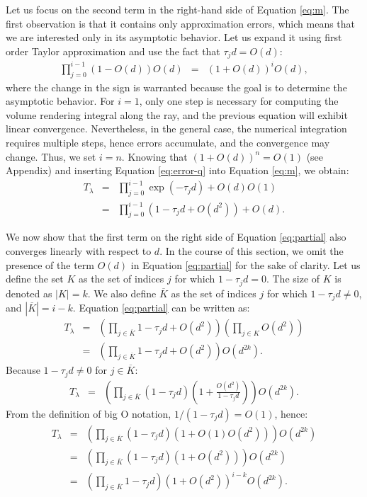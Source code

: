 Let us focus on the second term in the right-hand side of Equation \eqref{eq:m}. The first observation is that it contains only approximation errors, which means that we are  interested only in its asymptotic behavior. Let us expand it using first order Taylor approximation and use the fact that  $\tau_j d = O(d)$: 
\begin{eqnarray}
\prod_{j=0}^{i-1}\left(1-O(d)\right)O(d) &=& \left(1+O(d)\right)^iO(d), \label{eq:error-q}
\end{eqnarray}
%
where the change in the sign is warranted because the goal is to determine the asymptotic behavior. For $i = 1$, only one step is necessary for computing the volume rendering integral along the ray, and the previous equation will exhibit linear convergence.  Nevertheless, in the general case, the numerical integration requires multiple steps, hence errors accumulate, and the convergence may change. Thus,  we set $i = n$. Knowing that $(1 + O(d) )^{n} = O(1)$ (see Appendix) and inserting Equation \eqref{eq:error-q} into Equation \eqref{eq:m}, we obtain:
\begin{eqnarray}
T_\lambda
& = & \prod_{j=0}^{i-1}\exp(-\tau_j d)  + O(d)O(1)\\
& = & \prod_{j=0}^{i-1} \left(1 - \tau_jd + O(d^2)\right) + O(d).\label{eq:partial}
\end{eqnarray}

We now show that the first term on the right side of Equation \eqref{eq:partial}
also converges linearly with respect to $d$. In the course of this section, we omit the presence of the term $O(d)$ in Equation \eqref{eq:partial} for the sake of clarity. Let us define the set $K$ as the set of indices $j$ for which $1-\tau_j d = 0$. The size of $K$ is denoted as $|K| = k$. We also define $\overline{K}$ as the set of indices $j$ for which $1-\tau_j d \neq 0$, and $|\overline{K}|=i-k$.  
%
Equation \eqref{eq:partial} can be written as:
\begin{eqnarray}
T_\lambda
& = & \left( \prod_{j \in \overline{K}}1 - \tau_jd + O(d^2) \right) \left( \prod_{j \in K}O(d^2) \right) \\
& = & \left( \prod_{j \in \overline{K}}1 - \tau_jd + O(d^2) \right) O(d^{2k}).
\end{eqnarray}
Because $1-\tau_j d \neq 0$ for $j \in \overline{K}$:
\begin{eqnarray}
T_\lambda
& = &\left( \prod_{j \in \overline{K}} (1 - \tau_jd) \left(1 + \frac{O(d^2)}{1-\tau_j d} \right) \right) O(d^{2k}).
\end{eqnarray}
From the definition of big O notation, $1/(1-\tau_j d) = O(1)$, hence:
\begin{eqnarray}
T_\lambda
& = &\left( \prod_{j \in \overline{K}} (1 - \tau_jd) \left(1 + O(1)O(d^2) \right) \right) O(d^{2k})\\
& = &\left( \prod_{j \in \overline{K}} (1 - \tau_jd) (1 +O(d^2) ) \right) O(d^{2k})\\
& = &\left( \prod_{j \in \overline{K}} 1 - \tau_jd \right) (1 + O(d^2) )^{i-k} O(d^{2k}). \label{eq:k}
\end{eqnarray}

